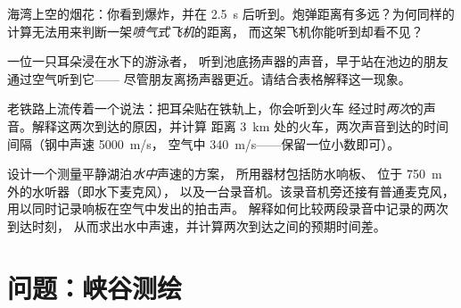 \begin{exercise}[$\star\star$]\label{exo:g7:sound-production:9}
海湾上空的烟花：你看到爆炸，并在
\qty{2.5}{s} 后听到。炮弹距离有多远？为何同样的
计算无法用来判断一架\emph{喷气式飞机}的距离，
而这架飞机你能听到却看不见？
\end{exercise}

\begin{exercise}[$\star\star$]\label{exo:g7:sound-production:10}
一位一只耳朵浸在水下的游泳者，
听到池底扬声器的声音，早于站在池边的朋友通过空气听到它——
尽管朋友离扬声器更近。请结合表格解释这一现象。
\end{exercise}

\begin{exercise}[$\star\star$]\label{exo:g7:sound-production:11}
老铁路上流传着一个说法：把耳朵贴在铁轨上，你会听到火车
经过时\emph{两次}的声音。解释这两次到达的原因，并计算
距离 \qty{3}{km} 处的火车，两次声音到达的时间间隔（钢中声速 \qty{5000}{m/s}，
空气中 \qty{340}{m/s}——保留一位小数即可）。
\end{exercise}

\begin{exercise}[$\star\star\star$]\label{exo:g7:sound-production:12}
设计一个测量平静湖泊\emph{水中}声速的方案，
所用器材包括防水响板、
位于 \qty{750}{m} 外的水听器（即水下麦克风），
以及一台录音机。该录音机旁还接有普通麦克风，
用以同时记录响板在空气中发出的拍击声。
解释如何比较两段录音中记录的两次到达时刻，
从而求出水中声速，并计算两次到达之间的预期时间差。
\end{exercise}

\section{问题：峡谷测绘}

